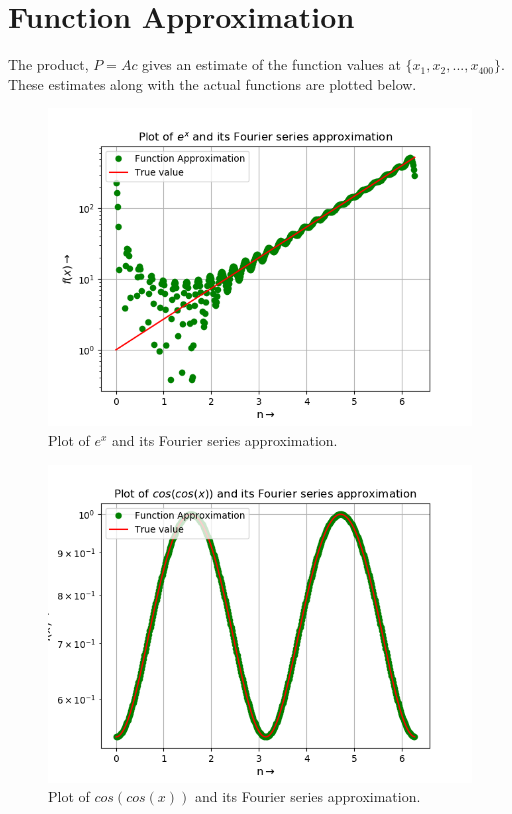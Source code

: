 \documentclass[11pt, a4paper]{article}
\begin{document}
\section{Function Approximation}
The product, $P = Ac$ gives an estimate of the function values at $\{x_1, x_2, ..., x_{400}\}$. These estimates along with the actual functions are plotted below.
\begin{figure}[!tbh]
   	\centering
   	\includegraphics[scale=0.5]{fig11.png}  %
   	\caption{Plot of $e^x$ and its Fourier series approximation.}
   	\label{fig:sample}
   \end{figure} 

\begin{figure}[!tbh]
   	\centering
   	\includegraphics[scale=0.5]{fig12.png}  %
   	\caption{Plot of $cos(cos(x))$ and its Fourier series approximation.}
   	\label{fig:sample}
   \end{figure} 
   
\end{document}
